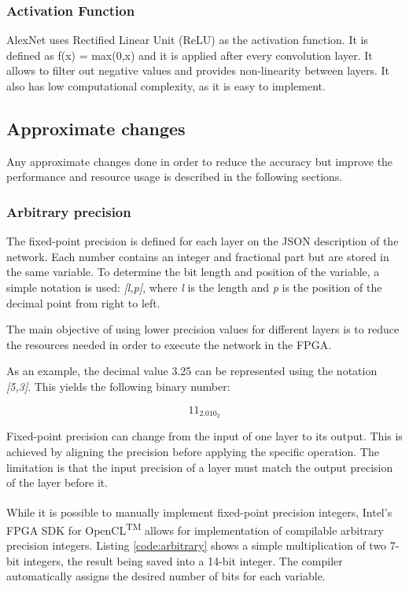 \begin{enumerate}
\subsubsection{Activation Function}

AlexNet uses Rectified Linear Unit (ReLU) as the activation function. 
It is defined as f(x) = max(0,x) and it is applied after every convolution layer.
It allows to filter out negative values and provides non-linearity between layers. It also
has low computational complexity, as it is easy to implement.


\subsection{Approximate changes}

Any approximate changes done in order to reduce the accuracy but improve the performance
and resource usage is described in the following sections.

\subsubsection{Arbitrary precision}

The fixed-point precision is defined for each layer on the JSON description of the network.
Each number contains an integer and fractional part but are stored in the same variable.
To determine the bit length and position of the variable, a simple notation is used: 
\textit{[l,p]}, where \textit{l} is the length and \textit{p} is the position of the decimal
point from right to left.

The main objective of using lower precision values for different layers is to reduce the
resources needed in order to execute the network in the FPGA.

As an example, the decimal value 3.25 can be represented using the notation \textit{[5,3]}.
This yields the following binary number:

$$
11_2.010_2
$$

Fixed-point precision can change from the input of one layer to its output. This is achieved
by aligning the precision before applying the specific operation. The limitation is that the
input precision of a layer must match the output precision of the layer before it.

While it is possible to manually implement fixed-point precision integers,
Intel's\textsuperscript{\textregistered} FPGA SDK for OpenCL\textsuperscript{TM} allows for implementation
of compilable arbitrary precision integers. Listing \ref{code:arbitrary} shows a simple
multiplication of two 7-bit integers, the result being saved into a 14-bit integer. The
compiler automatically assigns the desired number of bits for each variable.


\end{enumerate}
